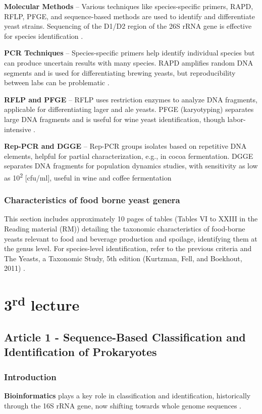 \textbf{Molecular Methods} – Various techniques like species-specific primers, RAPD, RFLP, PFGE, and sequence-based methods are used to identify and differentiate yeast strains. Sequencing of the D1/D2 region of the 26S rRNA gene is effective for species identification \cite*{L2-YeastClass}.

\textbf{PCR Techniques} – Species-specific primers help identify individual species but can produce uncertain results with many species. RAPD amplifies random DNA segments and is used for differentiating brewing yeasts, but reproducibility between labs can be problematic \cite*{L2-YeastClass}.

\textbf{RFLP and PFGE} – RFLP uses restriction enzymes to analyze DNA fragments, applicable for differentiating lager and ale yeasts. PFGE (karyotyping) separates large DNA fragments and is useful for wine yeast identification, though labor-intensive \cite*{L2-YeastClass}.

\textbf{Rep-PCR and DGGE} – Rep-PCR groups isolates based on repetitive DNA elements, helpful for partial characterization, e.g., in cocoa fermentation. DGGE separates DNA fragments for population dynamics studies, with sensitivity as low as 10\textsuperscript{2} [cfu/ml], useful in wine and coffee fermentation \cite*{L2-YeastClass}

\subsubsection*{Characteristics of food borne yeast genera}
This section includes approximately 10 pages of tables (Tables VI to XXIII in the Reading material (RM)) detailing the taxonomic characteristics of food-borne yeasts relevant to food and beverage production and spoilage, identifying them at the genus level. For species-level identification, refer to the previous criteria and The Yeasts, a Taxonomic Study, 5th edition (Kurtzman, Fell, and Boekhout, 2011) \cite*{L2-YeastClass}.

\section{3\textsuperscript{rd} lecture}
\subsection{Article 1 - Sequence-Based Classification and Identification of Prokaryotes}
\subsubsection*{Introduction}
\textbf{Bioinformatics} plays a key role in classification and identification, historically through the 16S rRNA gene, now shifting towards whole genome sequences \cite*{L3-SeqBasedClass}.

